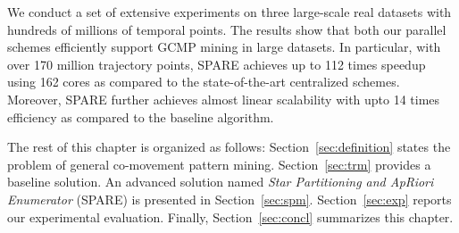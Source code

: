 We conduct a set of extensive experiments on three large-scale real datasets with hundreds of millions of
temporal points. 
The results show that both our parallel schemes efficiently support GCMP mining in large datasets.
In particular, with over 170 million trajectory points,
SPARE achieves up to 112 times speedup using 162 cores as compared to the state-of-the-art centralized schemes.
Moreover, SPARE further achieves almost linear scalability with upto 14 times efficiency
as compared to the baseline algorithm.


The rest of this chapter is organized as follows: %
Section~\ref{sec:definition} states the problem of general co-movement pattern mining. Section~\ref{sec:trm} provides a baseline 
solution. %
An advanced solution named
\emph{Star Partitioning and ApRiori Enumerator} (SPARE) is presented in Section~\ref{sec:spm}. Section~\ref{sec:exp} reports our experimental evaluation.
Finally, Section~\ref{sec:concl} summarizes this chapter.